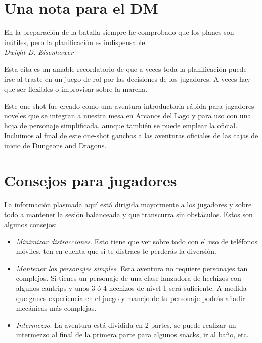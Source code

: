 \documentclass[10pt,twoside,twocolumn,openany]{dndbook}
\begin{document}
\section*{Una nota para el DM}

\begin{DndReadAloud}
  En la preparación de la batalla siempre he comprobado que los planes son inútiles, pero la 
  planificación es indispensable. \\
  \emph{Dwight D. Eisenhower}
\end{DndReadAloud}

Esta cita es un amable recordatorio de que a veces toda la planificación puede irse al traste 
en un juego de rol por las decisiones de los jugadores. A veces hay que ser flexibles o improvisar 
sobre la marcha.

Este one-shot fue creado como una aventura introductoria rápida para jugadores noveles que se 
integran a nuestra mesa en Arcanos del Lago y para uso con una hoja de personaje simplificada, 
aunque también se puede emplear la oficial. Incluimos al final de este one-shot ganchos a las 
aventuras oficiales de las cajas de inicio de Dungeons and Dragons.

\section*{Consejos para jugadores}

La información plasmada aquí está dirigida mayormente a los jugadores y sobre todo a mantener la 
sesión balanceada y que transcurra sin obstáculos. Estos son algunos consejos:

\begin{itemize}
  \item \emph{Minimizar distracciones}. Esto tiene que ver sobre todo con el uso de teléfonos 
  móviles, ten en cuenta que si te distraes te perderás la diversión.
  \item \emph{Mantener los personajes simples}. Esta aventura no requiere personajes tan complejos.
  Si tienes un personaje de una clase lanzadora de hechizos con algunos cantrips y unos 3 ó 4 
  hechizos de nivel 1 será suficiente. A medida que ganes experiencia en el juego y manejo de tu 
  personaje podrás añadir mecánicas más complejas.
  \item \emph{Intermezzo}. La aventura está dividida en 2 partes, se puede realizar un intermezzo 
  al final de la primera parte para algunos snacks, ir al baño, etc.
\end{itemize}
\end{document}

